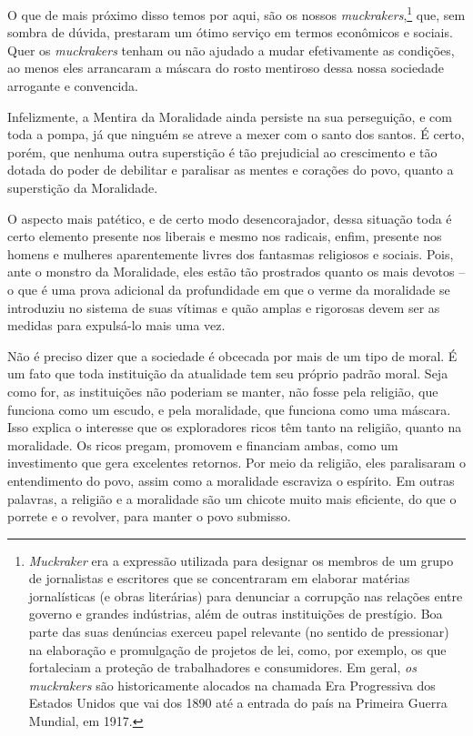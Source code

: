 O que de mais próximo disso temos por aqui, são os nossos
\emph{muckrakers},\footnote{\emph{Muckraker} era a expressão utilizada
  para designar os membros de um grupo de jornalistas e escritores que
  se concentraram em elaborar matérias jornalísticas (e obras
  literárias) para denunciar a corrupção nas relações entre governo e
  grandes indústrias, além de outras instituições de prestígio. Boa
  parte das suas denúncias exerceu papel relevante (no sentido de
  pressionar) na elaboração e promulgação de projetos de lei, como, por
  exemplo, os que fortaleciam a proteção de trabalhadores e
  consumidores. Em geral, \emph{os muckrakers} são historicamente
  alocados na chamada Era Progressiva dos Estados Unidos que vai dos
  1890 até a entrada do país na Primeira Guerra Mundial, em 1917.} que,
sem sombra de dúvida, prestaram um ótimo serviço em termos econômicos e
sociais. Quer os \emph{muckrakers} tenham ou não ajudado a mudar
efetivamente as condições, ao menos eles arrancaram a máscara do rosto
mentiroso dessa nossa sociedade arrogante e convencida.

Infelizmente, a Mentira da Moralidade ainda persiste na sua perseguição,
e com toda a pompa, já que ninguém se atreve a mexer com o santo dos
santos. É certo, porém, que nenhuma outra superstição é tão prejudicial
ao crescimento e tão dotada do poder de debilitar e paralisar as mentes
e corações do povo, quanto a superstição da Moralidade.

O aspecto mais patético, e de certo modo desencorajador, dessa situação
toda é certo elemento presente nos liberais e mesmo nos radicais, enfim,
presente nos homens e mulheres aparentemente livres dos fantasmas
religiosos e sociais. Pois, ante o monstro da Moralidade, eles estão tão
prostrados quanto os mais devotos -- o que é uma prova adicional da
profundidade em que o verme da moralidade se introduziu no sistema de
suas vítimas e quão amplas e rigorosas devem ser as medidas para
expulsá-lo mais uma vez.

Não é preciso dizer que a sociedade é obcecada por mais de um tipo de
moral. É um fato que toda instituição da atualidade tem seu próprio
padrão moral. Seja como for, as instituições não poderiam se manter, não
fosse pela religião, que funciona como um escudo, e pela moralidade, que
funciona como uma máscara. Isso explica o interesse que os exploradores
ricos têm tanto na religião, quanto na moralidade. Os ricos pregam,
promovem e financiam ambas, como um investimento que gera excelentes
retornos. Por meio da religião, eles paralisaram o entendimento do povo,
assim como a moralidade escraviza o espírito. Em outras palavras, a
religião e a moralidade são um chicote muito mais eficiente, do que o
porrete e o revolver, para manter o povo submisso.

